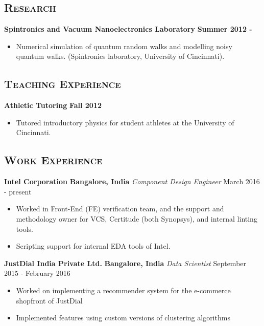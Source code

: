 \documentclass[10pt]{article}
\begin{document}

\subsection*{\textsc{\large Research}}
\textbf{Spintronics and Vacuum Nanoelectronics Laboratory} \hfill \textbf{Summer 2012 - }
\begin{itemize}
\item Numerical simulation of quantum random walks and modelling noisy quantum walks. (Spintronics laboratory, University of Cincinnati).
\end{itemize}

\subsection*{\textsc{\large Teaching Experience}}
\textbf{Athletic Tutoring} \hfill \textbf{Fall 2012}
\begin{itemize}
\item Tutored introductory physics for student athletes at the University of Cincinnati.
\end{itemize}

\subsection*{\textsc{\large Work Experience}}
\textbf{Intel Corporation} \hfill \textbf{Bangalore, India} \newline
\textit{Component Design Engineer} \hfill March 2016 - present
\begin{itemize}
\item Worked in Front-End (FE) verification team, and the support and methodology owner for VCS, Certitude (both Synopsys), and internal linting tools.
\item Scripting support for internal EDA tools of Intel.
\end{itemize}

\textbf{JustDial India Private Ltd.} \hfill \textbf{Bangalore, India} \newline
\textit{Data Scientist} \hfill September 2015 - February 2016
\begin{itemize}
\item Worked on implementing a recommender system for the e-commerce shopfront of JustDial
\item Implemented features using custom versions of clustering algorithms
\end{itemize}
\end{document}
